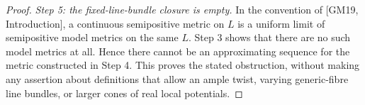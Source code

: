 \begin{proof}
\emph{Step 5: the fixed-line-bundle closure is empty.}
In the convention of [GM19, Introduction], a continuous semipositive
metric on \(L\) is a uniform limit of semipositive model metrics on
the same \(L\). Step 3 shows that there are no such model metrics at
all. Hence there cannot be an approximating sequence for the metric
constructed in Step 4. This proves the stated obstruction, without
making any assertion about definitions that allow an ample twist,
varying generic-fibre line bundles, or larger cones of real local
potentials.
\end{proof}
